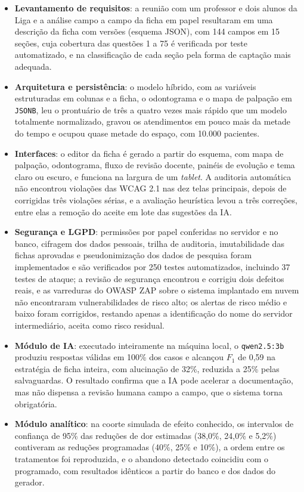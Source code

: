 \begin{itemize}
	\item \textbf{Levantamento de requisitos}: a reunião com um professor e dois alunos da Liga e a análise campo a campo da ficha em papel resultaram em uma descrição da ficha com versões (esquema JSON), com 144 campos em 15 seções, cuja cobertura das questões 1 a 75 é verificada por teste automatizado, e na classificação de cada seção pela forma de captação mais adequada.
	\item \textbf{Arquitetura e persistência}: o modelo híbrido, com as variáveis estruturadas em colunas e a ficha, o odontograma e o mapa de palpação em \texttt{JSONB}, leu o prontuário de três a quatro vezes mais rápido que um modelo totalmente normalizado, gravou os atendimentos em pouco mais da metade do tempo e ocupou quase metade do espaço, com 10.000 pacientes.
	\item \textbf{Interfaces}: o editor da ficha é gerado a partir do esquema, com mapa de palpação, odontograma, fluxo de revisão docente, painéis de evolução e tema claro ou escuro, e funciona na largura de um \textit{tablet}. A auditoria automática não encontrou violações das WCAG 2.1 nas dez telas principais, depois de corrigidas três violações sérias, e a avaliação heurística levou a três correções, entre elas a remoção do aceite em lote das sugestões da IA.
	\item \textbf{Segurança e LGPD}: permissões por papel conferidas no servidor e no banco, cifragem dos dados pessoais, trilha de auditoria, imutabilidade das fichas aprovadas e pseudonimização dos dados de pesquisa foram implementados e são verificados por 250 testes automatizados, incluindo 37 testes de ataque; a revisão de segurança encontrou e corrigiu dois defeitos reais, e as varreduras do OWASP ZAP sobre o sistema implantado em nuvem não encontraram vulnerabilidades de risco alto; os alertas de risco médio e baixo foram corrigidos, restando apenas a identificação do nome do servidor intermediário, aceita como risco residual.
	\item \textbf{Módulo de IA}: executado inteiramente na máquina local, o \texttt{qwen2.5:3b} produziu respostas válidas em 100\% dos casos e alcançou $F_1$ de 0,59 na estratégia de ficha inteira, com alucinação de 32\%, reduzida a 25\% pelas salvaguardas. O resultado confirma que a IA pode acelerar a documentação, mas não dispensa a revisão humana campo a campo, que o sistema torna obrigatória.
	\item \textbf{Módulo analítico}: na coorte simulada de efeito conhecido, os intervalos de confiança de 95\% das reduções de dor estimadas (38,0\%, 24,0\% e 5,2\%) contiveram as reduções programadas (40\%, 25\% e 10\%), a ordem entre os tratamentos foi reproduzida, e o abandono detectado coincidiu com o programado, com resultados idênticos a partir do banco e dos dados do gerador.

\end{itemize}

